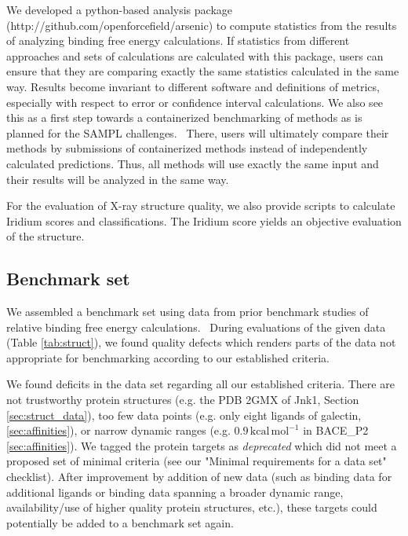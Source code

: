 \documentclass[9pt,bestpractices]{livecoms}
\begin{document}
We developed a python-based analysis package\\ (http://github.com/openforcefield/arsenic) to compute statistics from the results of analyzing binding free energy calculations. If statistics from different approaches and sets of calculations are calculated with this package, users can ensure that they are comparing exactly the same statistics calculated in the same way. Results become invariant to different software and definitions of metrics, especially with respect to error or confidence interval calculations. We also see this as a first step towards a containerized benchmarking of methods as is planned for the SAMPL challenges.~\cite{mobley_sampl_} There, users will ultimately compare their methods by submissions of containerized methods instead of independently calculated predictions. Thus, all methods will use exactly the same input and their results will be analyzed in the same way. 

For the evaluation of X-ray structure quality, we also provide scripts to calculate Iridium scores and classifications. The Iridium score yields an objective evaluation of the structure.

\subsection{Benchmark set}
\label{sec:benchmark_set}

We assembled a benchmark set using data from prior benchmark studies of relative binding free energy calculations.~\cite{wang_accurate_2015,gapsys_large_2020,schindler_largescale_2020} During evaluations of the given data (Table \ref{tab:struct}), we found quality defects which  renders parts of the data not appropriate for benchmarking according to our established criteria.

We found deficits in the data set regarding all our established criteria. There are not trustworthy protein structures (e.g. the PDB 2GMX of Jnk1, Section \ref{sec:struct_data}),
too few data points (e.g. only eight ligands of galectin, \ref{sec:affinities}), or
narrow dynamic ranges (e.g. $0.9\,\mathrm{kcal\,mol^{-1}}$ in BACE\_P2 \ref{sec:affinities}).
% 
We tagged the protein targets as \textit{deprecated} which did not meet a proposed set of minimal criteria (see our "Minimal requirements for a data set" checklist). After improvement by addition of new data (such as binding data for additional ligands or binding data spanning a broader dynamic range, availability/use of higher quality protein structures, etc.), these targets could potentially be added to a benchmark set again. 
\end{document}
